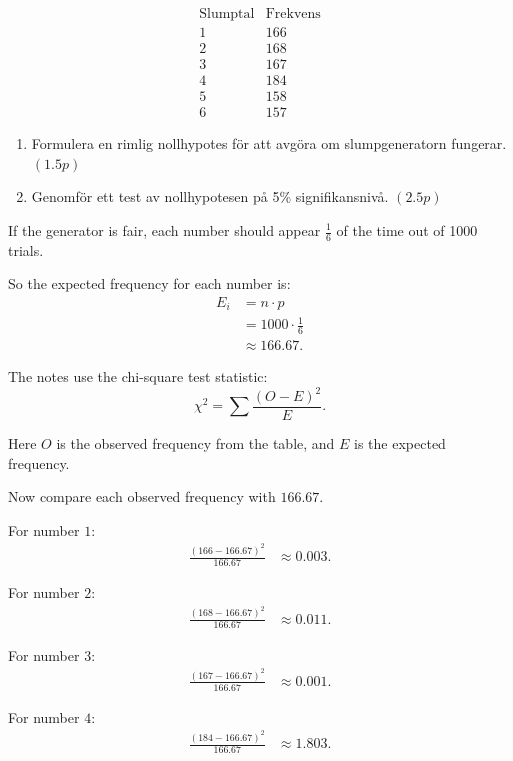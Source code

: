\documentclass[10pt]{article}
\begin{document}
\[
\begin{array}{c|c}
\text{Slumptal} & \text{Frekvens}\\
\hline
1 & 166\\
2 & 168\\
3 & 167\\
4 & 184\\
5 & 158\\
6 & 157
\end{array}
\]

\begin{enumerate}[label=\alph*)]
\item Formulera en rimlig nollhypotes för att avgöra
om slumpgeneratorn fungerar. \((1.5p)\)

\item Genomför ett test av nollhypotesen på
5\% signifikansnivå. \((2.5p)\)
\end{enumerate}

If the generator is fair, each number should appear
\(\frac{1}{6}\) of the time out of 1000 trials.

So the expected frequency for each number is:
\begin{align*}
E_i
&=
n\cdot p
\\[2mm]
&=
1000\cdot \frac{1}{6}
\\[2mm]
&\approx 166.67.
\end{align*}

The notes use the chi-square test statistic:
\[
\chi^2
=
\sum
\frac{(O-E)^2}{E}.
\]

Here \(O\) is the observed frequency from the table,
and \(E\) is the expected frequency.

Now compare each observed frequency with \(166.67\).

For number \(1\):
\begin{align*}
\frac{(166-166.67)^2}{166.67}
&\approx 0.003.
\end{align*}

For number \(2\):
\begin{align*}
\frac{(168-166.67)^2}{166.67}
&\approx 0.011.
\end{align*}

For number \(3\):
\begin{align*}
\frac{(167-166.67)^2}{166.67}
&\approx 0.001.
\end{align*}

For number \(4\):
\begin{align*}
\frac{(184-166.67)^2}{166.67}
&\approx 1.803.
\end{align*}
\end{document}
